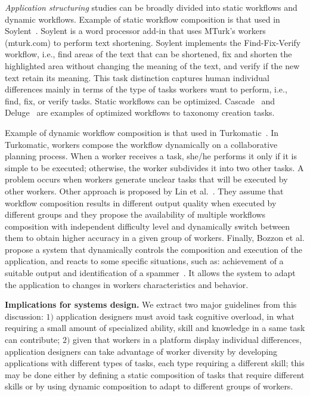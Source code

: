 \documentclass[11pt]{bmc_article_s50}
\begin{document}
\textit{Application structuring} studies can be broadly divided into static workflows and dynamic workflows. Example of static workflow composition is that used in Soylent~\cite{Bernstein:2010}. Soylent is a word processor add-in that uses MTurk's workers (mturk.com) to perform text shortening. Soylent implements the Find-Fix-Verify workflow, i.e., find areas of the text that can be shortened, fix and shorten the highlighted area without changing the meaning of the text, and verify if the new text retain its meaning. This task distinction captures human individual differences mainly in terms of the type of tasks workers want to perform, i.e., find, fix, or verify tasks. Static workflows can be optimized. Cascade~\cite{Chilton:2013} and Deluge~\cite{Bragg:2013} are examples of optimized workflows to taxonomy creation tasks.

Example of dynamic workflow composition is that used in Turkomatic~\cite{Kulkarni2012}. In Turkomatic, workers compose the workflow dynamically on a collaborative planning process. When a worker receives a task, she/he performs it only if it is simple to be executed; otherwise, the worker subdivides it into two other tasks. A problem occurs when workers generate unclear tasks that will be executed by other workers. Other approach is proposed by Lin et al.~\cite{Christopher:2012}. They assume that workflow composition results in different output quality when executed by different groups and they propose the availability of multiple workflows composition with independent difficulty level and dynamically switch between them to obtain higher accuracy in a given group of workers. Finally, Bozzon et al. propose a system that dynamically controls the composition and execution of the application, and reacts to some specific situations, such as: achievement of a suitable output and identification of a spammer~\cite{Bozzon:2013}. It allows the system to adapt the application to changes in workers characteristics and behavior.

\textbf{Implications for systems design.} We extract two major guidelines from this discussion: $1)$ application designers must avoid task cognitive overload, in what requiring a small amount of specialized ability, skill and knowledge in a same task can contribute; $2)$ given that workers in a platform display individual differences, application designers can take advantage of worker diversity by developing applications with different types of tasks, each type requiring a different skill; this may be done either by defining a static composition of tasks that require different skills or by using dynamic composition to adapt to different groups of workers.
\end{document}
